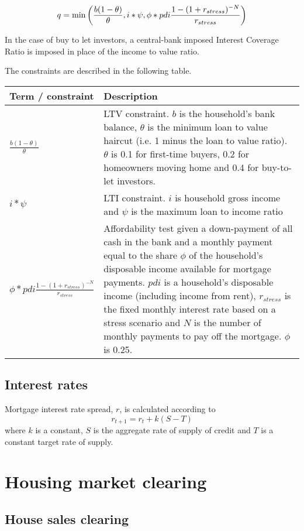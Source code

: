 \documentclass{article}
\begin{document}
\bigskip 
\begin{equation}
q=\min \left( \frac{b(1-\theta )}{\theta },i\ast \psi ,\phi \ast pdi\frac{%
1-(1+r_{stress})^{-N}}{r_{stress}}\right)
\end{equation}

\bigskip

In the case of buy to let investors, a central-bank imposed Interest Coverage Ratio is imposed in place of the income to value ratio.

\bigskip The constraints are described in the following table.

\bigskip

\noindent \bigskip 
\begin{tabular}{p{1.5in}|p{4in}}
Term / constraint & Description \\ \hline\hline
$\frac{b(1-\theta )}{\theta }$ & LTV constraint. $b$ is the household's bank
balance, $\theta $ is the minimum loan to value haircut (i.e. 1 minus the
loan to value ratio). $\theta $ is 0.1 for first-time buyers, 0.2 for
homeowners moving home and 0.4 for buy-to-let investors. \\ 
$i\ast \psi $ & LTI constraint. $i$ is household gross income and $\psi $ is
the maximum loan to income ratio \\ 
$\phi \ast pdi\frac{1-(1+r_{stress})^{-N}}{r_{stress}}$ & Affordability test
given a down-payment of all cash in the bank and a monthly payment equal to
the share $\phi $ of the household's disposable income available for
mortgage payments. $pdi$ is a household's disposable income (including
income from rent), $r_{stress}$ is the fixed monthly interest rate based on
a stress scenario and $N$ is the number of monthly payments to pay off the
mortgage. $\phi $ is 0.25.%
\end{tabular}

\subsection{Interest rates}
Mortgage interest rate spread, $r$, is calculated according to
\[
r_{t+1} = r_{t} + k(S-T)
\]
where $k$ is a constant, $S$ is the aggregate rate of supply of credit and $T$ is a constant target rate of supply.

\section{Housing market clearing}

\subsection{House sales clearing}
\end{document}

